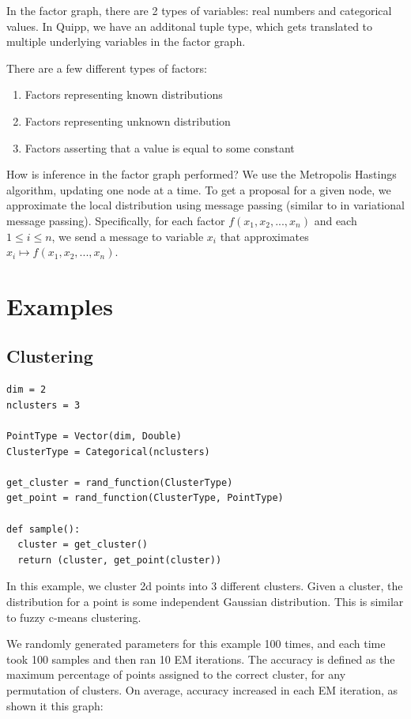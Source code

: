 \documentclass[proceed]{article}
\begin{document}
    In the factor graph, there are 2 types of variables: real numbers
    and categorical values.
    In Quipp, we have an additonal tuple type, which gets translated
    to multiple underlying variables in the factor graph.

    There are a few different types of factors:
    \begin{enumerate}
      \item Factors representing known distributions
      \item Factors representing unknown distribution
      \item Factors asserting that a value is equal to some constant
    \end{enumerate}

    How is inference in the factor graph performed?  We use the Metropolis Hastings
    algorithm, updating one node at a time.  To get a proposal for a given node,
    we approximate the local distribution using message passing (similar to
    in variational message passing).  Specifically, for each factor
    $f(x_1, x_2, ..., x_n)$ and each $1 \leq i \leq n$, we send a message
    to variable $x_i$ that approximates $x_i \mapsto f(x_1, x_2, ..., x_n)$.



  \section{Examples}

  \subsection{Clustering}
\begin{verbatim}
dim = 2
nclusters = 3

PointType = Vector(dim, Double)
ClusterType = Categorical(nclusters)

get_cluster = rand_function(ClusterType)
get_point = rand_function(ClusterType, PointType)

def sample():
  cluster = get_cluster()
  return (cluster, get_point(cluster))
\end{verbatim}

In this example, we cluster 2d points into 3 different clusters.  Given a cluster, the distribution for a point is some independent Gaussian distribution.  This is similar to fuzzy c-means clustering.

We randomly generated parameters for this example 100 times, and each time took 100 samples and then ran 10 EM iterations.  The accuracy is defined as the maximum percentage of points assigned to the correct cluster, for any permutation of clusters.  On average, accuracy increased in each EM iteration, as shown it this graph:
\end{document}
